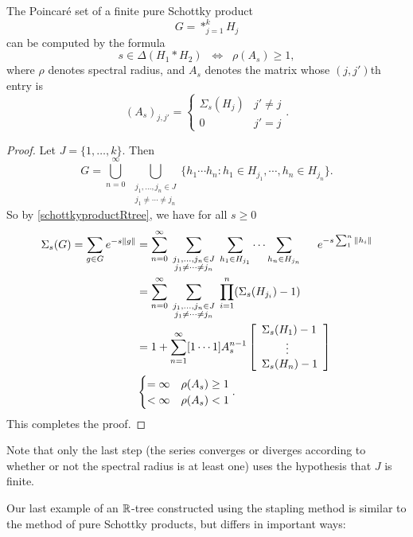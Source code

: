 \begin{proposition}
\label{propositionschottkyproductRtree2}
The Poincar\'e set of a finite pure Schottky product 
\[
G = \ast_{j = 1}^k H_j
\] 
can be computed by the formula
\[
s\in \Delta(H_1\ast H_2) \;\;\Leftrightarrow\;\; \rho(A_s) \geq 1,
\]
where $\rho$ denotes spectral radius, and $A_s$ denotes the matrix whose $(j,j')$th entry is
\[
(A_s)_{j,j'} = \begin{cases}
\Sigma_s(H_j) & j'\neq j\\
0 & j' = j
\end{cases}.
\]
\end{proposition}
\begin{proof}
Let $J = \{1,\ldots,k\}$. Then
\[
G = \bigcup_{n = 0}^\infty \; \bigcup_{\substack{j_1,\ldots,j_n\in J \\ j_1\neq \cdots \neq j_n}} \{h_1\cdots h_n : h_1\in H_{j_1}, \cdots, h_n\in H_{j_n}\}.
\]
So by \eqref{schottkyproductRtree}, we have for all $s\geq 0$
\begin{align*}
\Sigma_s(G)
= \sum_{g\in G} e^{-s\|g\|}
&= \sum_{n = 0}^\infty \; \sum_{\substack{j_1,\ldots,j_n\in J \\ j_1\neq \cdots \neq j_n}} \; \sum_{h_1\in H_{j_1}} \cdots \sum_{h_n\in H_{j_n}} ~~~~ e^{-s\sum_1^n \|h_i\|}\\
&= \sum_{n = 0}^\infty \; \sum_{\substack{j_1,\ldots,j_n\in J \\ j_1\neq \cdots \neq j_n}} \; \prod_{i = 1}^n (\Sigma_s(H_{j_i}) - 1)\\
&= 1 + \sum_{n = 1}^\infty [1 \cdots 1] A_s^{n - 1} \left[\begin{array}{l}
\Sigma_s(H_1) - 1\\
\phantom{MM}\vdots\phantom{MM}\\
\Sigma_s(H_n) - 1
\end{array}\right]\\
&\begin{cases}
= \infty & \rho(A_s) \geq 1\\
< \infty & \rho(A_s) < 1
\end{cases}.
\end{align*}
This completes the proof.
\end{proof}
Note that only the last step (the series converges or diverges according to whether or not the spectral radius is at least one) uses the hypothesis that $J$ is finite.


Our last example of an $\R$-tree constructed using the stapling method is similar to the method of pure Schottky products, but differs in important ways:

